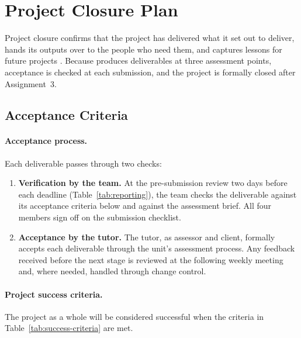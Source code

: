 \section{Project Closure Plan}\label{sec:closure}

Project closure confirms that the project has delivered what it set out to deliver, hands its outputs over to the people who need them, and captures lessons for future projects \parencite{pmi2021pmbok}. Because \projectname{} produces deliverables at three assessment points, acceptance is checked at each submission, and the project is formally closed after Assignment~3.

\subsection{Acceptance Criteria}\label{sec:acceptance}

\paragraph{Acceptance process.} Each deliverable passes through two checks:

\begin{enumerate}[nosep]
  \item \textbf{Verification by the team.} At the pre-submission review two days before each deadline (Table~\ref{tab:reporting}), the team checks the deliverable against its acceptance criteria below and against the assessment brief. All four members sign off on the submission checklist.
  \item \textbf{Acceptance by the tutor.} The tutor, as assessor and client, formally accepts each deliverable through the unit's assessment process. Any feedback received before the next stage is reviewed at the following weekly meeting and, where needed, handled through change control.
\end{enumerate}

\paragraph{Project success criteria.} The project as a whole will be considered successful when the criteria in Table~\ref{tab:success-criteria} are met.

